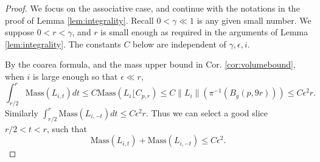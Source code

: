 \documentclass{article}
\theoremstyle{definition}
\newcommand{\norm}[1]{\left\lVert#1\right\rVert}
\begin{document}
		\begin{proof}
			We focus on the associative case, and continue with the notations in the proof of Lemma \ref{lem:integrality}. Recall $0< \gamma\ll 1$ is any given small number.  We suppose $0<r<\gamma$, and $r$ is small enough as required in the arguments of Lemma \ref{lem:integrality}. The constants $C$ below are independent of $\gamma, \epsilon, i$. 
			
			
			
		
			
			
			
			
			
			
		
			
	By the coarea formula, and the mass upper bound in Cor. \ref{cor:volumebound}, when $i$ is large enough so that $\epsilon\ll r$,
			\[
			\int_{r/2}^r  \text{Mass}   (  {L_{i,t}} )  dt \leq C \text{Mass}(   L_i \lfloor  C_{p,r}     ) \leq C \norm{L_i}( \pi^{-1}(B_g(p, 9r))   )\leq C\epsilon^2 r. 
			\]
			Similarly
		$
				\int_{r/2}^r  \text{Mass}   (  {L_{i,-t}} )  dt \leq C\epsilon^2 r. 
$
			Thus we can select a  good slice $r/2<t<r$, such that 
			\begin{equation}
			\text{Mass}   (  {L_{i,t}} ) + 	\text{Mass}   (  {L_{i,-t}} ) \leq C\epsilon^2.
			\end{equation}
			
			
			
		
			
			
			

			
			

\end{proof}
\end{document}
